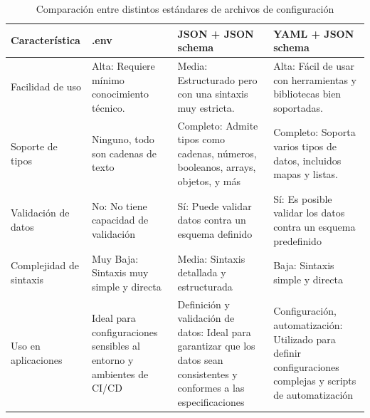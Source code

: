 \begin{longtable}{|p{3cm}|p{4.5cm}|p{5cm}|p{4.5cm}|}
    \caption{Comparación entre distintos estándares de archivos de configuración}
    \label{table:config-files-comparison}                                                                                                                                                                                                                                                                                                     \\
    \hline
    \textbf{Característica} & \textbf{.env}                                                        & \textbf{JSON + JSON schema}                                                                                                & \textbf{YAML + JSON schema}                                                                                 \\
    \hline
    \endfirsthead
    Facilidad de uso        & Alta: Requiere mínimo conocimiento técnico.                          & Media: Estructurado pero con una sintaxis muy estricta.                                                                    & Alta: Fácil de usar con herramientas y bibliotecas bien soportadas.                                         \\
    \hline
    Soporte de tipos        & Ninguno, todo son cadenas de texto                                   & Completo: Admite tipos como cadenas, números, booleanos, arrays, objetos, y más                                            & Completo: Soporta varios tipos de datos, incluidos mapas y listas.                                          \\
    \hline
    Validación de datos     & No: No tiene capacidad de validación                                 & Sí: Puede validar datos contra un esquema definido                                                                         & Sí: Es posible validar los datos contra un esquema predefinido                                              \\
    \hline
    Complejidad de sintaxis & Muy Baja: Sintaxis muy simple y directa                              & Media: Sintaxis detallada y estructurada                                                                                   & Baja: Sintaxis simple y directa                                                                             \\
    \hline
    Uso en aplicaciones     & Ideal para configuraciones sensibles al entorno y ambientes de CI/CD & Definición y validación de datos: Ideal para garantizar que los datos sean consistentes y conformes a las especificaciones & Configuración, automatización: Utilizado para definir configuraciones complejas y scripts de automatización \\

\end{longtable}

